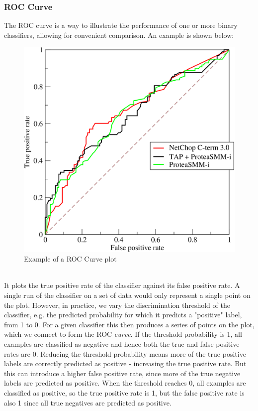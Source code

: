 \documentclass[11pt]{article} %
\theoremstyle{plain}
\theoremstyle{definition}
\begin{document}
\subsubsection{ROC Curve}
The ROC curve is a way to illustrate the performance of one or more binary classifiers, allowing for convenient comparison. An example \cite{wiki:ROC_Curve} is shown below:  
\begin{figure}[!ht]
  \centering    
  \caption{Example of a ROC Curve plot}
  \label{fig:ROC_Curve}
  \includegraphics[scale=1.9]{ROC_Curve.png}
\end{figure}
\\
\noindent
It plots the true positive rate of the classifier against its false positive rate. A single run of the classifier on a set of data would only represent a single point on the plot. However, in practice, we vary the discrimination threshold of the classifier, e.g. the predicted probability for which it predicts a "positive" label, from 1 to 0. For a given classifier this then produces a series of points on the plot, which we connect to form the ROC \textit{curve}. If the threshold probability is 1, all examples are classified as negative and hence both the true and false positive rates are 0. Reducing the threshold probability means more of the true positive labels are correctly predicted as positive - increasing the true positive rate. But this can introduce a higher false positive rate, since more of the true negative labels are predicted as positive. When the threshold reaches 0, all examples are classified as positive, so the true positive rate is 1, but the false positive rate is also 1 since all true negatives are predicted as positive. 
\end{document}
